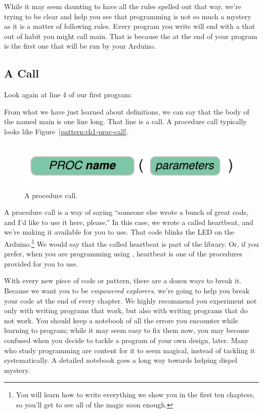 While it may seem daunting to have all the rules spelled out that way, we're trying to be clear and help you see that programming is not so much a mystery as it is a matter of following rules. Every program you write will end with a \PROC that out of habit you might call {\code main}. That is because the \PROC at the end of your program is the first one that will be run by your Arduino. %

\subsection{A \PROCedure Call}
Look again at line 4 of our first program:



From what we have just learned about \PROC definitions, we can say that the body of the \PROC named {\code main} is one line long. That line is a \PROCedure call. A procedure call typically looks like Figure~\vref{pattern:ch1-proc-call}.

\begin{figure}[h!]
  \begin{center}
    \includegraphics[width=\linewidth]{images/ch1-proc-call-pattern}
    \caption{A procedure call.}
    \label{pattern:ch1-proc-call}
  \end{center}
\end{figure}

A procedure call is a way of saying ``someone else wrote a bunch of great code, and I'd like to use it here, please.'' In this case, we wrote a \PROC called {\code heartbeat}, and we're making it available for you to use. That code blinks the LED on the Arduino.\footnote{You will learn how to write everything we show you in the first ten chapters, so you'll get to see all of the magic soon enough.} We would say that the \PROC called {\code heartbeat} is part of the \plumbing library. Or, if you prefer, when you are programming using \plumbing, {\code heartbeat} is one of the procedures provided for you to use.

\BREAKAGE
With every new piece of code or pattern, there are a dozen ways to break it. Because we want you to be {\em empowered explorers}, we're going to help you break your code at the end of every chapter. We highly recommend you experiment not only with writing programs that work, but also with writing programs that {\strong do not} work. You should keep a notebook of all the errors you encounter while learning to program; while it may seem easy to fix them now, you may become confused when you decide to tackle a program of your own design, later. Many who study programming are content for it to seem magical, instead of tackling it systematically. A detailed notebook goes a long way towards helping dispel mystery.

